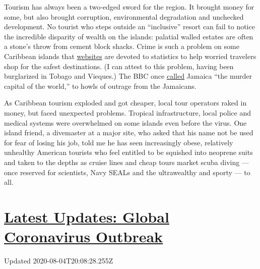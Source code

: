 Tourism has always been a two-edged sword for the region. It brought
money for some, but also brought corruption, environmental degradation
and unchecked development. No tourist who steps outside an ``inclusive''
resort can fail to notice the incredible disparity of wealth on the
islands: palatial walled estates are often a stone's throw from cement
block shacks. Crime is such a problem on some Caribbean islands that
\href{https://www.tripsavvy.com/safest-and-most-dangerous-caribbean-islands-4157732}{websites}
are devoted to statistics to help worried travelers shop for the safest
destinations. (I can attest to this problem, having been burglarized in
Tobago and Vieques.) The BBC once
\href{http://www.bbc.co.uk/caribbean/news/story/2006/01/060103_murderlist.shtml}{called}
Jamaica ``the murder capital of the world,'' to howls of outrage from
the Jamaicans.

As Caribbean tourism exploded and got cheaper, local tour operators
raked in money, but faced unexpected problems. Tropical infrastructure,
local police and medical systems were overwhelmed on some islands even
before the virus. One island friend, a divemaster at a major site, who
asked that his name not be used for fear of losing his job, told me he
has seen increasingly obese, relatively unhealthy American tourists who
feel entitled to be squished into neoprene suits and taken to the depths
as cruise lines and cheap tours market scuba diving --- once reserved
for scientists, Navy SEALs and the ultrawealthy and sporty --- to all.

\hypertarget{latest-updates-global-coronavirus-outbreak}{%
\section{\texorpdfstring{\href{https://www.nytimes3xbfgragh.onion/2020/08/04/world/coronavirus-cases.html?action=click\&pgtype=Article\&state=default\&region=MAIN_CONTENT_1\&context=storylines_live_updates}{Latest
Updates: Global Coronavirus
Outbreak}}{Latest Updates: Global Coronavirus Outbreak}}\label{latest-updates-global-coronavirus-outbreak}}

Updated 2020-08-04T20:08:28.255Z

